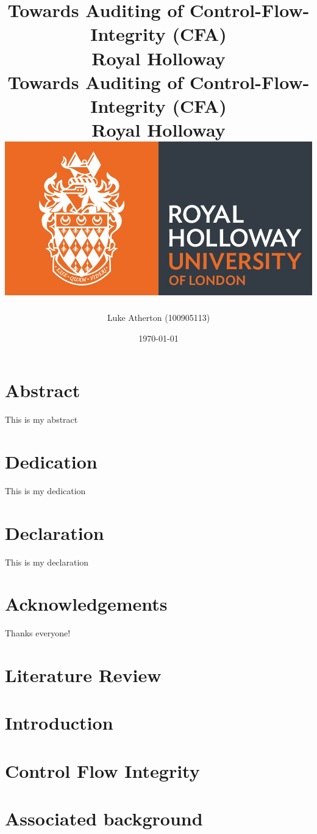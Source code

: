 \documentclass[10pt]{report}
\title{
	{Towards Auditing of Control-Flow-Integrity (CFA)}\\
	{\large Royal Holloway}\\
}
\title{
	{Towards Auditing of Control-Flow-Integrity (CFA)}\\
	{\large Royal Holloway}\\
	{\includegraphics[scale=0.5]{royalholloway.jpg}}
}
\author{Luke Atherton (100905113)}
\date{\today}
\newif\iflitreview
\begin{document}
\maketitle

\iflitreview

\else

\chapter*{Abstract}
This is my abstract

\chapter*{Dedication}
This is my dedication

\chapter*{Declaration}
This is my declaration

\chapter*{Acknowledgements}
Thanks everyone!

\fi

\tableofcontents
\lstlistoflistings
\listoffigures
\listoftables

\iflitreview

\chapter{Literature Review}

\else

\chapter{Introduction}







\chapter{Control Flow Integrity}


\chapter{Associated background}




\end{document}

